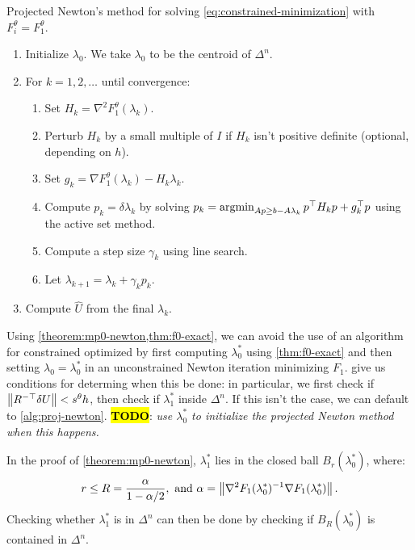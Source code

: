 \documentclass[eikonal.tex]{subfiles}
\begin{document}
\begin{algorithm}[H]
  \caption{Projected Newton's method for solving
    \cref{eq:constrained-minimization} with
    $F_i^\theta = F_1^\theta$.}\label{alg:proj-newton}
  \begin{enumerate}[nolistsep]
  \item Initialize $\lambda_0$. We take $\lambda_0$ to be the centroid
    of $\Delta^n$.
  \item For $k = 1, 2, \hdots$ until convergence:
    \begin{enumerate}
    \item Set $H_k = \nabla^2 F_1^\theta(\lambda_k)$.
    \item Perturb $H_k$ by a small multiple of $I$ if $H_k$ isn't
      positive definite (optional, depending on $h$).
    \item Set $g_k = \nabla F_1^\theta(\lambda_k) - H_k \lambda_k$.
    \item Compute $p_k = \delta \lambda_k$ by solving
      $p_k = \operatorname{argmin}_{Ap \geq b - A\lambda_k} p^\top H_k p + g_k^\top
      p$ using the active set method.
    \item Compute a step size $\gamma_k$ using line search.
    \item Let $\lambda_{k + 1} = \lambda_k + \gamma_k p_k$.
    \end{enumerate}
  \item Compute $\hat{U}$ from the final $\lambda_k$.
  \end{enumerate}
\end{algorithm}

Using \cref{theorem:mp0-newton,thm:f0-exact}, we can avoid the use
of an algorithm for constrained optimized by first computing
$\lambda_0^*$ using \cref{thm:f0-exact} and then setting
$\lambda_0 = \lambda_0^*$ in an unconstrained Newton iteration
minimizing $F_1$.  give us
conditions for determing when this be done: in particular, we first
check if $\left\|R^{-\top} \delta U\right\| < s^\theta h$, then check if
$\lambda_1^*$ inside $\Delta^n$. If this isn't the case, we can
default to \cref{alg:proj-newton}. \hl{\textbf{TODO}}: \emph{use
  $\lambda_0^*$ to initialize the projected Newton method when this
  happens.}

In the proof of \cref{theorem:mp0-newton}, $\lambda_1^*$ lies in the
closed ball $B_r(\lambda_0^*)$, where:
\begin{equation}
  r \leq R = \frac{\alpha}{1 - \alpha/2}, \mbox{ and } \alpha = \left\|\nabla^2 F_1(\lambda_0^*)^{-1} \nabla F_1(\lambda_0^*)\right\|.
\end{equation}
Checking whether $\lambda_1^*$ is in $\Delta^n$ can then be done by
checking if $B_R(\lambda_0^*)$ is contained in $\Delta^n$.
\end{document}
